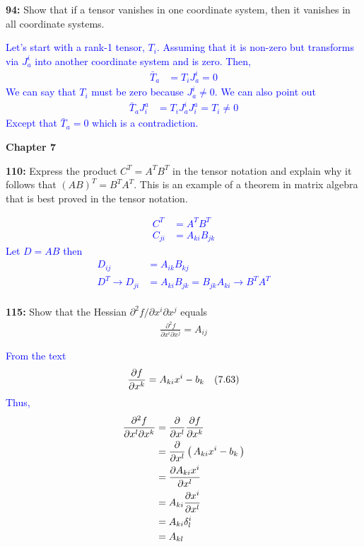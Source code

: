 \documentclass[12pt,a4paper]{report}
\newcommand{\BLUE}[1]{\textcolor{blue}{#1}}
\begin{document}
\textbf{94: }Show that if a tensor vanishes in one coordinate system, then it vanishes in all coordinate systems.

\BLUE{Let's start with a rank-1 tensor, $T_i$.  Assuming that it is non-zero but transforms via $J^i_a$ into another coordinate system and is zero.  Then,
\begin{align*}
	\bar{T}_a &= T_iJ^i_a = 0
\end{align*}We can say that $T_i$ must be zero because $J^i_a \ne 0$.  We can also point out 
\begin{align*}
	\bar{T}_aJ^a_i &= T_iJ^i_aJ^a_i = T_i \ne 0
\end{align*} Except that $\bar{T}_a = 0$ which is a contradiction.
}

\HLINE
\textbf{Chapter 7}

\textbf{110: }Express the product $C^T=A^TB^T$ in the tensor notation and explain why it follows that $(AB)^T = B^TA^T$.  This is an example of a theorem in matrix algebra that is best proved in the tensor notation.

\BLUE{\begin{align*}
	C^T &= A^TB^T \\
	C_{ji} &= A_{ki}B_{jk} 
\end{align*}Let $D = AB$ then 
\begin{align*}
	D_{ij} &= A_{ik}B_{kj} \\
	D^T \to D_{ji} &= A_{ki}B_{jk} = B_{jk}A_{ki} \to B^TA^T
\end{align*}
}\\

\textbf{115: }Show that the Hessian $\partial^2 f/\partial x^i\partial x^j$ equals 
\begin{align*}
	\frac{\partial^2 f}{\partial x^i\partial x^j} = A_{ij}
\end{align*}

\BLUE{From the text
\begin{align*}
	\frac{\partial f}{\partial x^k} &= A_{ki}x^i - b_k & (7.63)
\end{align*}Thus,
\begin{align*}
	\frac{\partial^2 f}{\partial x^l\partial x^k} &= \frac{\partial }{\partial x^l} \frac{\partial f}{\partial x^k} \\
	&= \frac{\partial }{\partial x^l}\left (\, A_{ki}x^i - b_k \,\right ) \\
	&= \frac{\partial A_{ki}x^i}{\partial x^l} \\
	&= A_{ki} \frac{\partial x^i}{\partial x^l} \\
	&= A_{ki} \delta^i_l \\
	&= A_{kl}
\end{align*}
}
\end{document}
